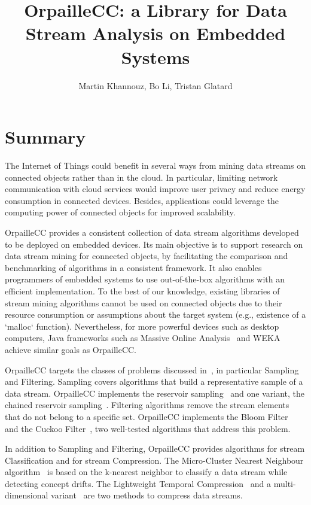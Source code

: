 \documentclass{article}
\title{OrpailleCC: a Library for Data Stream Analysis on Embedded Systems}
\author{Martin Khannouz, Bo Li, Tristan Glatard}
\begin{document}
\maketitle
\section*{Summary}

The Internet of Things could benefit in several ways from mining data 
streams on connected objects rather than in the cloud. In particular, 
limiting network communication with cloud services would improve user 
privacy and reduce energy consumption in connected devices. Besides, 
applications could leverage the computing power of connected objects 
for improved scalability.

OrpailleCC provides a consistent collection of data stream algorithms 
developed to be deployed on embedded devices.  Its main objective is to
support research on data stream mining for connected objects,
by facilitating the comparison and benchmarking of algorithms in a 
consistent framework. It also enables programmers of embedded systems to use 
out-of-the-box algorithms with an efficient implementation.
To the best of our knowledge, existing libraries of stream mining
algorithms cannot be used on connected objects due to their resource consumption or
assumptions about the target system (e.g., existence of a `malloc` function).
Nevertheless, for more powerful devices such as desktop computers, Java
frameworks such as Massive Online Analysis~\cite{moa} and WEKA~\cite{weka} achieve
similar goals as OrpailleCC.

OrpailleCC targets the classes of problems discussed in~\cite{kejariwal2015},
 in particular Sampling and 
Filtering. Sampling covers algorithms that 
build a representative sample of a
data stream. OrpailleCC implements the reservoir
sampling~\cite{reservoir_sampling} and one variant, the chained reservoir
sampling~\cite{chained_reservoir_sampling}. Filtering algorithms
remove the stream elements that do not belong to a specific set.
OrpailleCC implements the Bloom Filter~\cite{bloom} and the Cuckoo
Filter~\cite{cuckoo_filter}, two well-tested algorithms that address this
problem.

In addition to Sampling and Filtering, OrpailleCC
provides algorithms for stream Classification and for stream Compression. The 
Micro-Cluster Nearest Neighbour algorithm~\cite{mc-nn} is based on the 
k-nearest neighbor to classify a data stream while detecting concept 
drifts. The Lightweight Temporal Compression~\cite{ltc} and a 
multi-dimensional variant~\cite{ltcd} are two methods to compress data 
streams.
\end{document}
